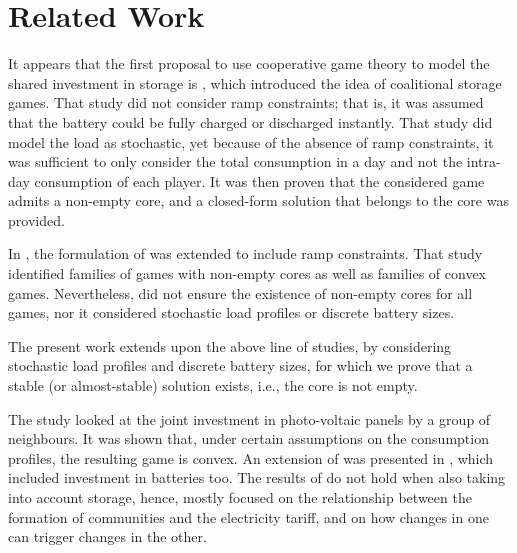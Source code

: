 


\section{Related Work}

It appears that the first proposal to use cooperative game theory to model the shared investment in storage is \cite{chakraborty2018}, which introduced the idea of coalitional storage games. That study did not consider ramp constraints; that is, it was assumed that the battery could be fully charged or discharged instantly. That study did model the load as stochastic, yet because of the absence of ramp constraints, it was sufficient to only consider the total consumption in a day and not the intra-day consumption of each player. It was then proven that the considered game admits a non-empty core, and a closed-form solution that belongs to the core was provided.

In \cite{kiedanskigames}, the formulation of \cite{chakraborty2018} was extended to include ramp constraints. That study identified families of games with non-empty cores as well as families of convex games. Nevertheless, \cite{kiedanskigames} did not ensure the existence of non-empty cores for all games, nor it considered stochastic load profiles or discrete battery sizes.


The present work extends upon the above line of studies, by considering stochastic load profiles and discrete battery sizes, for which we prove that a stable (or almost-stable) solution exists, i.e., the core is not empty.

The study \cite{RePEc:cam:camdae:1740} looked at the joint investment in photo-voltaic panels by a group of neighbours. It was shown that, under certain assumptions on the consumption profiles, the resulting game is convex. An extension of \cite{RePEc:cam:camdae:1740} was presented in \cite{RePEc:cam:camdae:1828:snowball}, which included investment in batteries too. The results of \cite{RePEc:cam:camdae:1740} do not hold when also taking into account storage, hence, \cite{RePEc:cam:camdae:1828:snowball} mostly focused on the relationship between the formation of communities and the electricity tariff, and on how changes in one can trigger changes in the other.

